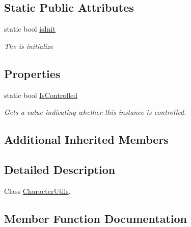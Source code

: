 \subsection*{Static Public Attributes}
\begin{DoxyCompactItemize}
\item 
static bool \hyperlink{class_lerp2_a_p_i_1_1_hepers_1_1_unity___extensions_1_1_utils_1_1_character_utils_abba842d03220b3a203d206f77db1908a}{is\+Init}
\begin{DoxyCompactList}\small\item\em The is initialize \end{DoxyCompactList}\end{DoxyCompactItemize}
\subsection*{Properties}
\begin{DoxyCompactItemize}
\item 
static bool \hyperlink{class_lerp2_a_p_i_1_1_hepers_1_1_unity___extensions_1_1_utils_1_1_character_utils_a1c4ec64f4a43cd0de27a292721d2f637}{Is\+Controlled}
\begin{DoxyCompactList}\small\item\em Gets a value indicating whether this instance is controlled. \end{DoxyCompactList}\end{DoxyCompactItemize}
\subsection*{Additional Inherited Members}


\subsection{Detailed Description}
Class \hyperlink{class_lerp2_a_p_i_1_1_hepers_1_1_unity___extensions_1_1_utils_1_1_character_utils}{Character\+Utils}. 



\subsection{Member Function Documentation}
\mbox{\label{class_lerp2_a_p_i_1_1_hepers_1_1_unity___extensions_1_1_utils_1_1_character_utils_aec64db87650680b8265782154ac5ea69}} 

